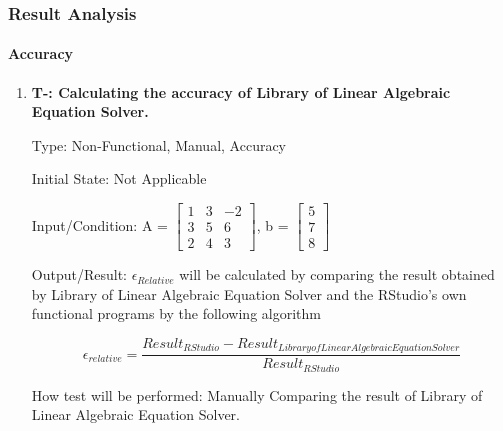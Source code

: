 \documentclass[12pt, titlepage]{article}
\newcounter{tnum}
\begin{document}
\subsubsection{Result Analysis}

\paragraph{Accuracy}

\begin{enumerate}

\item{\textbf{T-\thetnum \label{t-speed}: Calculating the
accuracy of Library of Linear Algebraic Equation Solver.}}


Type: Non-Functional, Manual, Accuracy
					
Initial State: Not Applicable
					
Input/Condition: A = $\begin{bmatrix} 
1 & 3 & -2 \\
3 & 5 & 6\\
2 & 4 & 3
\end{bmatrix}$, b = $\begin{bmatrix} 
5\\
7\\
8 
\end{bmatrix}$
					
Output/Result: $\epsilon_{Relative}$ will be calculated by comparing the result
obtained by Library of Linear Algebraic Equation Solver and the RStudio's own
functional programs by the following algorithm

\[\epsilon_{relative} = \frac{Result_{RStudio} - Result_{Library of Linear
Algebraic Equation Solver}}{Result_{RStudio}}\]
		

How test will be performed: Manually Comparing the result of Library of Linear
Algebraic Equation Solver.

					
\end{enumerate}

\end{document}
